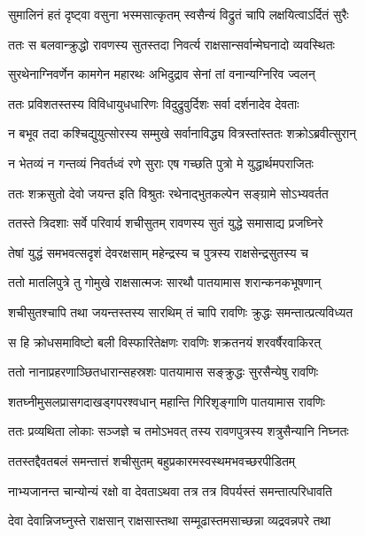 
\twolineshloka
{सुमालिनं हतं दृष्ट्वा वसुना भस्मसात्कृतम्}
{स्वसैन्यं विद्रुतं चापि लक्षयित्वाऽर्दितं सुरैः} %

\twolineshloka
{ततः स बलवान्क्रुद्धो रावणस्य सुतस्तदा}
{निवर्त्य राक्षसान्सर्वान्मेघनादो व्यवस्थितः} %

\twolineshloka
{सुरथेनाग्निवर्णेन कामगेन महारथः}
{अभिदुद्राव सेनां तां वनान्यग्निरिव ज्वलन्} %

\twolineshloka
{ततः प्रविशतस्तस्य विविधायुधधारिणः}
{विदुद्रुवुर्दिशः सर्वा दर्शनादेव देवताः} %

\twolineshloka
{न बभूव तदा कश्चिद्युयुत्सोरस्य सम्मुखे}
{सर्वानाविद्ध्य वित्रस्तांस्ततः शक्रोऽब्रवीत्सुरान्} %

\twolineshloka
{न भेतव्यं न गन्तव्यं निवर्तध्वं रणे सुराः}
{एष गच्छति पुत्रो मे युद्धार्थमपराजितः} %

\twolineshloka
{ततः शक्रसुतो देवो जयन्त इति विश्रुतः}
{रथेनाद्भुतकल्पेन सङ्ग्रामे सोऽभ्यवर्तत} %

\twolineshloka
{ततस्ते त्रिदशाः सर्वे परिवार्य शचीसुतम्}
{रावणस्य सुतं युद्धे समासाद्य प्रजघ्निरे} %

\twolineshloka
{तेषां युद्धं समभवत्सदृशं देवरक्षसाम्}
{महेन्द्रस्य च पुत्रस्य राक्षसेन्द्रसुतस्य च} %

\twolineshloka
{ततो मातलिपुत्रे तु गोमुखे राक्षसात्मजः}
{सारथौ पातयामास शरान्कनकभूषणान्} %

\twolineshloka
{शचीसुतश्चापि तथा जयन्तस्तस्य सारथिम्}
{तं चापि रावणिः क्रुद्धः समन्तात्प्रत्यविध्यत} %

\twolineshloka
{स हि क्रोधसमाविष्टो बली विस्फारितेक्षणः}
{रावणिः शक्रतनयं शरवर्षैरवाकिरत्} %

\twolineshloka
{ततो नानाप्रहरणाञ्छितधारान्सहस्रशः}
{पातयामास सङ्क्रुद्धः सुरसैन्येषु रावणिः} %

\twolineshloka
{शतघ्नीमुसलप्रासगदाखड्गपरश्वधान्}
{महान्ति गिरिशृङ्गाणि पातयामास रावणिः} %

\twolineshloka
{ततः प्रव्यथिता लोकाः सञ्जज्ञे च तमोऽभवत्}
{तस्य रावणपुत्रस्य शत्रुसैन्यानि निघ्नतः} %

\twolineshloka
{ततस्तद्दैवतबलं समन्तात्तं शचीसुतम्}
{बहुप्रकारमस्वस्थमभवच्छरपीडितम्} %

\twolineshloka
{नाभ्यजानन्त चान्योन्यं रक्षो वा देवताऽथवा}
{तत्र तत्र विपर्यस्तं समन्तात्परिधावति} %

\twolineshloka
{देवा देवान्निजघ्नुस्ते राक्षसान् राक्षसास्तथा}
{सम्मूढास्तमसाच्छन्ना व्यद्रवन्नपरे तथा} %

